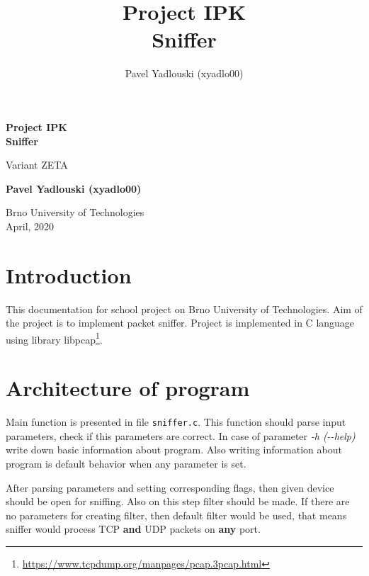 \documentclass[12pt,a4paper]{article}
\title{Project IPK \\
Sniffer}
\author{Pavel Yadlouski (xyadlo00)}
\begin{document}
\begin{titlepage}
   \begin{center}
       \vspace*{1cm}

       \textbf{Project IPK\\Sniffer}

       \vspace{0.5cm}
        Variant ZETA
            
       \vspace{1.5cm}

       \textbf{Pavel Yadlouski (xyadlo00)}

       \vfill
            
            
       \vspace{0.8cm}
     
       Brno University of Technologies\\
       April, 2020
            
   \end{center}
\end{titlepage}

\section*{Introduction}

This documentation for school project on Brno University of Technologies. Aim of 
the project is to implement packet sniffer. Project is implemented in C language 
using library libpcap\footnote{\url{https://www.tcpdump.org/manpages/pcap.3pcap.html}}.

\section{Architecture of program}

Main function is presented in file \texttt{sniffer.c}. This function should 
parse input parameters, check if this parameters are correct. In case of 
parameter \textit{-h (-{}-help)} write down basic information about program. 
Also writing information about program is default behavior when any parameter is 
set. 

After parsing parameters and setting corresponding flags, then given device 
should be open for sniffing. Also on this step filter should be made. If there 
are no parameters for creating filter, then default filter would be used, that 
means sniffer would process TCP \textbf{and} UDP packets on \textbf{any} port. 
\end{document}
